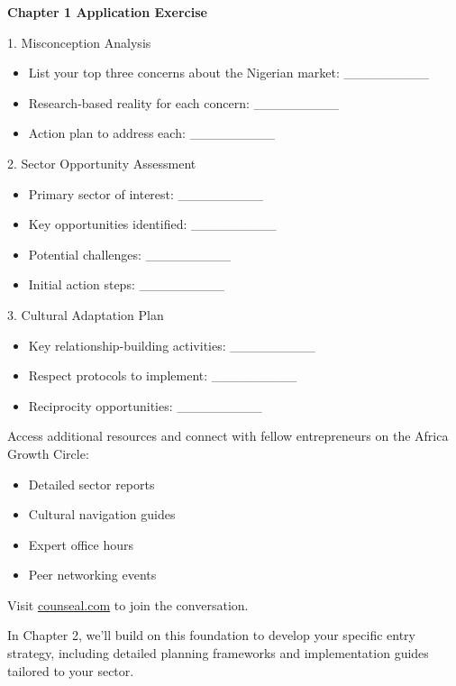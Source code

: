 \begin{workshopbox}
\textbf{Chapter 1 Application Exercise}

1. Misconception Analysis
\begin{itemize}
    \item List your top three concerns about the Nigerian market: \_\_\_\_\_\_\_\_\_
    \item Research-based reality for each concern: \_\_\_\_\_\_\_\_\_
    \item Action plan to address each: \_\_\_\_\_\_\_\_\_
\end{itemize}

2. Sector Opportunity Assessment
\begin{itemize}
    \item Primary sector of interest: \_\_\_\_\_\_\_\_\_
    \item Key opportunities identified: \_\_\_\_\_\_\_\_\_
    \item Potential challenges: \_\_\_\_\_\_\_\_\_
    \item Initial action steps: \_\_\_\_\_\_\_\_\_
\end{itemize}

3. Cultural Adaptation Plan
\begin{itemize}
    \item Key relationship-building activities: \_\_\_\_\_\_\_\_\_
    \item Respect protocols to implement: \_\_\_\_\_\_\_\_\_
    \item Reciprocity opportunities: \_\_\_\_\_\_\_\_\_
\end{itemize}
\end{workshopbox}

\begin{communitybox}
Access additional resources and connect with fellow entrepreneurs on the Africa Growth Circle:
\begin{itemize}
    \item Detailed sector reports
    \item Cultural navigation guides
    \item Expert office hours
    \item Peer networking events
\end{itemize}
Visit \href{https://viz.li/csl-book-ngbiz}{counseal.com} to join the conversation.
\end{communitybox}

\begin{importantbox}
In Chapter 2, we'll build on this foundation to develop your specific entry strategy, including detailed planning frameworks and implementation guides tailored to your sector.
\end{importantbox}